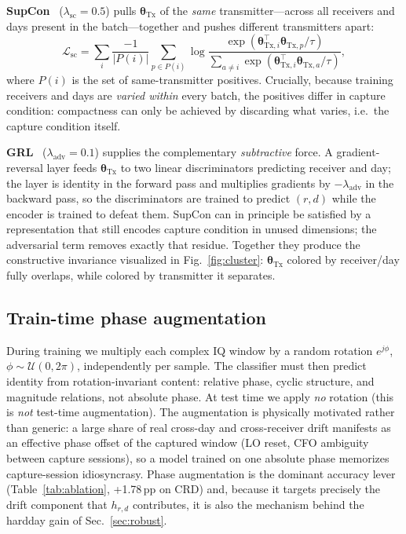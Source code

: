 \documentclass[journal]{IEEEtran}
\newcommand{\tx}{\boldsymbol{\theta}_{\mathrm{Tx}}}
\begin{document}
\textbf{SupCon}~\cite{khosla2020} ($\lambda_{\mathrm{sc}}=0.5$) pulls $\tx$ of the \emph{same} transmitter---across all receivers and days present in the batch---together and pushes different transmitters apart:
\begin{equation}
\mathcal{L}_{\mathrm{sc}} = \sum_i \frac{-1}{|P(i)|} \sum_{p\in P(i)} \log \frac{\exp(\boldsymbol{\theta}_{\mathrm{Tx},i}^{\top} \boldsymbol{\theta}_{\mathrm{Tx},p} / \tau)}{\sum_{a\neq i} \exp(\boldsymbol{\theta}_{\mathrm{Tx},i}^{\top} \boldsymbol{\theta}_{\mathrm{Tx},a} / \tau)},
\label{eq:supcon}
\end{equation}
where $P(i)$ is the set of same-transmitter positives. Crucially, because training receivers and days are \emph{varied within} every batch, the positives differ in capture condition: compactness can only be achieved by discarding what varies, i.e.\ the capture condition itself.

\textbf{GRL}~\cite{ganin2016} ($\lambda_{\mathrm{adv}}=0.1$) supplies the complementary \emph{subtractive} force. A gradient-reversal layer feeds $\tx$ to two linear discriminators predicting receiver and day; the layer is identity in the forward pass and multiplies gradients by $-\lambda_{\mathrm{adv}}$ in the backward pass, so the discriminators are trained to predict $(r,d)$ while the encoder is trained to defeat them. SupCon can in principle be satisfied by a representation that still encodes capture condition in unused dimensions; the adversarial term removes exactly that residue. Together they produce the constructive invariance visualized in Fig.~\ref{fig:cluster}: $\tx$ colored by receiver/day fully overlaps, while colored by transmitter it separates.

\subsection{Train-time phase augmentation}
\label{sec:phase}
During training we multiply each complex IQ window by a random rotation $e^{j\phi}$, $\phi\sim\mathcal{U}(0,2\pi)$, independently per sample. The classifier must then predict identity from rotation-invariant content: relative phase, cyclic structure, and magnitude relations, not absolute phase. At test time we apply \emph{no} rotation (this is \emph{not} test-time augmentation). The augmentation is physically motivated rather than generic: a large share of real cross-day and cross-receiver drift manifests as an effective phase offset of the captured window (LO reset, CFO ambiguity between capture sessions), so a model trained on one absolute phase memorizes capture-session idiosyncrasy. Phase augmentation is the dominant accuracy lever (Table~\ref{tab:ablation}, +1.78\,pp on CRD) and, because it targets precisely the drift component that $h_{r,d}$ contributes, it is also the mechanism behind the hardday gain of Sec.~\ref{sec:robust}.
\end{document}
